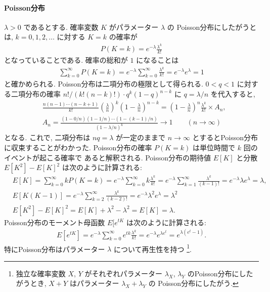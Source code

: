 \documentclass[12pt,twoside]{jarticle}
\theoremstyle{jplain}
\theoremstyle{jplain}
\theoremstyle{jplain}
\numberwithin{theorem}{section}
\numberwithin{equation}{section}
\numberwithin{figure}{section}
\numberwithin{table}{section}
\begin{document}
\paragraph{Poisson分布}
$\lambda>0$ であるとする. 確率変数 $K$ がパラメーター $\lambda$ の
Poisson分布にしたがうとは, $k=0,1,2,\ldots$ に対する $K=k$ の確率が
\begin{align*}
P(K=k)=e^{-\lambda}\frac{\lambda^k}{k!}
\end{align*}
となっていることである. 確率の総和が $1$ になることは
\begin{align*}
\sum_{k=0}^\infty P(K=k)
=e^{-\lambda}\sum_{k=0}^\infty\frac{\lambda^k}{k!}
=e^{-\lambda}e^\lambda
=1
\end{align*}
と確かめられる. Poisson分布は二項分布の極限として得られる.
$0<q<1$ に対する二項分布の確率 $n!/(k!(n-k)!)\cdot q^k(1-q)^{n-k}$
に $q=\lambda/n$ を代入すると,
\begin{align*}
&
\frac{n(n-1)\cdots(n-k+1)}{k!}
\left(\frac{\lambda}{n}\right)^k\left(1-\frac{\lambda}{n}\right)^{n-k}
=\left(1-\frac{\lambda}{n}\right)^n\frac{\lambda^k}{k!}
\times A_n,
\\ &
A_n
=\frac{(1-0/n)(1-1/n)\cdots(1-(k-1)/n)}{(1-\lambda/n)^k}
\to 1 \qquad (n\to\infty)
\end{align*}
となる. これで, 二項分布は $nq=\lambda$ が一定のままで $n\to\infty$
とするとPoisson分布に収束することがわかった.
Poisson分布の確率 $P(K=k)$ は単位時間で $k$ 回のイベントが起こる確率で
あると解釈される.
Poisson分布の期待値 $E[K]$ と分散 $E[K^2]-E[K]^2$ は次のように計算される:
\begin{align*}
&
E[K] = \sum_{k=0}^\infty k P(K=k)
= e^{-\lambda}\sum_{k=0}^\infty k \frac{\lambda^k}{k!}
= e^{-\lambda}\sum_{k=1}^\infty \frac{\lambda^k}{(k-1)!}
= e^{-\lambda}\lambda e^\lambda
= \lambda,
\\ &
E[K(K-1)] = e^{-\lambda}\sum_{k=2}^\infty \frac{\lambda^k}{(k-2)!}
=e^{-\lambda}\lambda^2 e^\lambda
=\lambda^2
\\ &
E[K^2]-E[K]^2 = E[K]+\lambda^2-\lambda^2 = E[K] = \lambda.
\end{align*}
Poisson分布のモーメント母函数 $E[e^{tK}$ は次のように計算される:
\begin{align*}
E[e^{tK}]
= e^{-\lambda}\sum_{k=0}^\infty e^{tk}\frac{\lambda^k}{k!}
= e^{-\lambda}e^{\lambda e^t}
= e^{\lambda(e^t-1)}.
\end{align*}
特にPoisson分布はパラメーター $\lambda$ について再生性を持つ%
\footnote{独立な確率変数 $X$, $Y$ がそれぞれパラメーター $\lambda_X$, $\lambda_Y$
のPoisson分布にしたがうとき, $X+Y$ はパラメーター $\lambda_X+\lambda_Y$ の
Poisson分布にしたがう.}.
\end{document}

